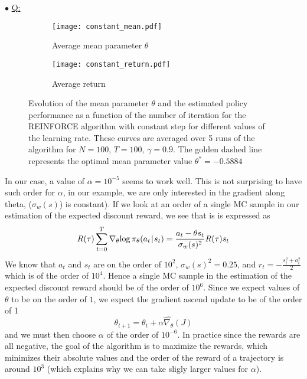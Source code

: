 \documentclass[a4paper, 11pt]{article}
\newcounter{cquestion}
\renewcommand{\thecquestion}{\arabic{cquestion}}
\newenvironment{question}
{\par \vspace{0.5em} \noindent \stepcounter{cquestion} \hspace{-1em}
 $\bullet$ \underline{Q\thecquestion :}}
{}
\newcommand{\parampicond}[3]{\pi_{#1}(#2 \hspace{-.2em}\mid\hspace{-.2em} #3)}
\begin{document}
\begin{question}
  \begin{figure}[ht]
    \centering
    \begin{subfigure}[t]{0.48\textwidth}
      \centering
      \texttt{[image: constant\_mean.pdf]}
      \caption{Average mean parameter $\theta$}\label{fig:constant-mean.pdf}
    \end{subfigure}
    \quad
    \begin{subfigure}[t]{0.48\textwidth}
      \centering
      \texttt{[image: constant\_return.pdf]}
      \caption{Average return}\label{fig:constant-return.pdf}
    \end{subfigure}
    \caption{Evolution of the mean parameter $\theta$ and the
      estimated policy performance as a function of the number of
      iteration for the REINFORCE algorithm with constant step for
      different values of the learning rate. These curves are averaged
      over 5 runs of the algorithm for $N = 100$, $T = 100$,
      $\gamma = 0.9$. The golden dashed line represents the optimal
      mean parameter value
      $\theta^* = -0.5884$}\label{fig:constant-step}
  \end{figure}


  In our case, a value of $\alpha = 10^{-5}$ seems to work well.  This
  is not surprising to have such order for $\alpha$, in our example,
  we are only interested in the gradient along theta, ($\sigma_w(s)$)
  is constant). If we look at an order of a single MC sample in our
  estimation of the expected discount reward, we see that is is
  expressed as
  \begin{displaymath}
    R(\tau) \sum_{t = 0}^T\nabla_{\theta}{\log{\parampicond{\theta}{a_t}{s_t}}}
    = \dfrac{a_t - \theta s_t}{\sigma_w(s)^2} R(\tau) s_t
  \end{displaymath}
  We know that $a_t$ and $s_t$ are on the order of $10^2$,
  $\sigma_w(s)^ 2 = 0.25$, and $r_t = -\frac{s_t^2 + a_t^2}{2}$ which
  is of the order of $10^4$. Hence a single MC sample in the
  estimation of the expected discount reward should be of the order of
  $10^6$. Since we expect values of $\theta$ to be on the order of
  $1$, we expect the gradient ascend update to be of the order of 1
  \begin{displaymath}
    \theta_{t+1} = \theta_t + \alpha \hat{\nabla_{\theta}}(J)
  \end{displaymath}
  and we must then choose $\alpha$ of the order of $10^{-6}$. In
  practice since the rewards are all negative, the goal of the
  algorithm is to maximize the rewards, which minimizes their absolute
  values and the order of the reward of a trajectory is around
  $10^{3}$ (which explains why we can take sligly larger values for
  $\alpha$).


\end{question}
\end{document}
